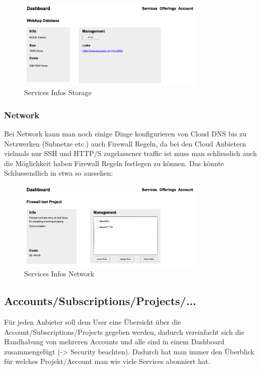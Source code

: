 \begin{figure}[!htbp]
\includegraphics[width=0.8\textwidth]{./03_Analyse/03_Dashboard/images/service_info_storage}
\caption{Services Infos Storage}
\end{figure}

\newpage
\subsubsection{Network}
Bei Network kann man noch einige Dinge konfigurieren von Cloud DNS bis zu 
Netzwerken (Subnetze etc.) auch Firewall Regeln, da bei den Cloud Anbietern 
vielmals nur SSH und HTTP/S zugelassener traffic ist muss man schliesslich auch 
die Möglichkeit haben Firewall Regeln festlegen zu können.
Das könnte Schlussendlich in etwa so aussehen:

\begin{figure}[!htbp]
  \includegraphics[width=0.8\textwidth]{./03_Analyse/03_Dashboard/images/service_info_network}
  \caption{Services Infos Network}
\end{figure}

\newpage

\subsection{Accounts/Subscriptions/Projects/...}
Für jeden Anbieter soll dem User eine Übersicht über die 
Account/Subscriptions/Projects gegeben werden, dadurch vereinfacht sich die 
Handhabung von mehreren Accounts und alle sind in einem Dashboard zusammengefügt 
(-> Security beachten).
Dadurch hat man immer den Überblick für welches Projekt/Account man wie viele 
Services abonniert hat.


